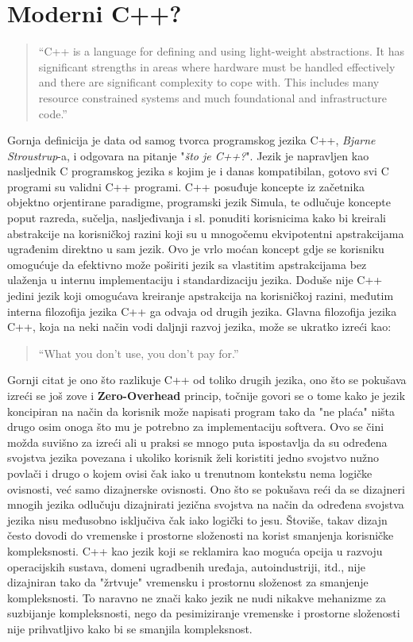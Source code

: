\section{Moderni C++?}
\begin{quote}
    ``C++ is a language for defining and using light-weight abstractions. It has significant strengths in areas where hardware must be handled effectively and there are significant complexity to cope with. This includes many resource constrained systems and much foundational and infrastructure code.''
\end{quote}
Gornja definicija\cite{bjarneStroustrupC++} je data od samog tvorca programskog jezika C++, \textit{Bjarne Stroustrup}-a, i odgovara na pitanje "\textit{što je C++?}". Jezik je napravljen kao nasljednik C programskog jezika s kojim je i danas kompatibilan, gotovo svi C programi su validni C++ programi. C++ posuđuje koncepte iz začetnika objektno orjentirane paradigme, programski jezik Simula, te odlučuje koncepte poput razreda, sučelja, nasljeđivanja i sl. ponuditi korisnicima kako bi kreirali abstrakcije na korisničkoj razini koji su u mnogočemu ekvipotentni apstrakcijama ugrađenim direktno u sam jezik. Ovo je vrlo moćan koncept gdje se korisniku omogućuje da efektivno može poširiti jezik sa vlastitim apstrakcijama bez ulaženja u internu implementaciju i standardizaciju jezika. Doduše nije C++ jedini jezik koji omogućava kreiranje apstrakcija na korisničkoj razini, međutim interna filozofija jezika C++ ga odvaja od drugih jezika. Glavna filozofija jezika C++, koja na neki način vodi daljnji razvoj jezika, može se ukratko izreći kao\cite{theDesignAndEvolutionOfC++}:
\begin{quote}
    ``What you don't use, you don't pay for.''
\end{quote}
Gornji citat je ono što razlikuje C++ od toliko drugih jezika, ono što se pokušava izreći se još zove i \textbf{Zero-Overhead} princip, točnije govori se o tome kako je jezik koncipiran na način da korisnik može napisati program tako da "ne plaća" ništa drugo osim onoga što mu je potrebno za implementaciju softvera. Ovo se čini možda suvišno za izreći ali u praksi se mnogo puta ispostavlja da su određena svojstva jezika povezana i ukoliko korisnik želi koristiti jedno svojstvo nužno povlači i drugo o kojem ovisi čak iako u trenutnom kontekstu nema logičke ovisnosti, već samo dizajnerske ovisnosti. Ono što se pokušava reći da se dizajneri mnogih jezika odlučuju dizajnirati jezična svojstva na način da određena svojstva jezika nisu međusobno isključiva čak iako logički to jesu. Štoviše, takav dizajn često dovodi do vremenske i prostorne složenosti na korist smanjenja korisničke kompleksnosti. C++ kao jezik koji se reklamira kao moguća opcija u razvoju operacijskih sustava, domeni ugradbenih uređaja, autoindustriji, itd., nije dizajniran tako da "žrtvuje" vremensku i prostornu složenost za smanjenje kompleksnosti. To naravno ne znači kako jezik ne nudi nikakve mehanizme za suzbijanje kompleksnosti, nego da pesimiziranje vremenske i prostorne složenosti nije prihvatljivo kako bi se smanjila kompleksnost. \\

